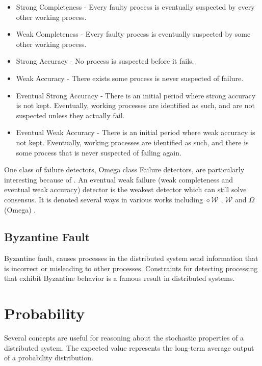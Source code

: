 \begin{itemize}
    \item Strong Completeness - Every faulty process is eventually suspected by
        every other working process.
    \item Weak Completeness - Every faulty process is eventually suspected by 
        some other working process.
    \item Strong Accuracy - No process is suspected before it fails.
    \item Weak Accuracy - There exists some process is never suspected of failure.
    \item Eventual Strong Accuracy - There is an initial period where strong accuracy is not kept. Eventually, working processes are identified as such, and are not suspected unless they actually fail.
    \item Eventual Weak Accuracy - There is an initial period where weak accuracy is not kept. Eventually, working processes are identified as such, and there is some process that is never suspected of failing again.
\end{itemize} 

One class of failure detectors, Omega class Failure detectors, are particularly interesting because of \cite{LEADERELECTIONEVAL}. An eventual weak failure (weak completeness and eventual weak accuracy) detector is the weakest detector which can still solve consensus. It is denoted several ways in various works including $\diamond \mathcal{W}$ \cite{FAILUREDETECTORS}, $\mathcal{W}$ \cite{WEAKESTFAILURE1} \cite{WEAKESTFAILURE2} and $\Omega$ (Omega) \cite{LEADERELECTIONEVAL}.


\subsection{Byzantine Fault}

Byzantine fault, causes processes in the distributed system send information that is incorrect or misleading to other processes.
Constraints for detecting processing that exhibit Byzantine behavior is a famous result in distributed systems.\cite{byzantine-generals}

\section{Probability}

Several concepts are useful for reasoning about the stochastic properties of a distributed system.
The expected value represents the long-term average output of a probability distribution.


